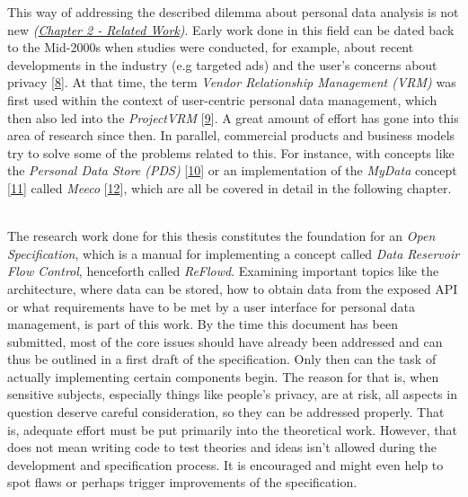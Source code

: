 \documentclass[12pt,english,a4paper,titlepage,cleardoublepage=empty,dottedtoc]{report}
\begin{document}
This way of addressing the described dilemma about personal data
analysis is not new \emph{(\protect\hyperlink{related-work}{Chapter 2 -
Related Work})}. Early work done in this field can be dated back to the
Mid-2000s when studies were conducted, for example, about recent
developments in the industry (e.g targeted ads) and the user's concerns
about privacy
{[}\protect\hyperlink{ref-study_2004_architecture-for-privacy-sensitive-ubiquitous-computing}{8}{]}.
At that time, the term \emph{Vendor Relationship Management (VRM)} was
first used within the context of user-centric personal data management,
which then also led into the \emph{ProjectVRM}
{[}\protect\hyperlink{ref-web_2010_projectvrm_about}{9}{]}. A great
amount of effort has gone into this area of research since then. In
parallel, commercial products and business models try to solve some of
the problems related to this. For instance, with concepts like the
\emph{Personal Data Store (PDS)}
{[}\protect\hyperlink{ref-paper_2013_the-personal-data-store-approach-to-personal-data-security_2013}{10}{]}
or an implementation of the \emph{MyData} concept
{[}\protect\hyperlink{ref-whitepaper_2014_mydata-a-nordic-model-for-human-centered-personal-data-management-and-processing}{11}{]}
called \emph{Meeco}
{[}\protect\hyperlink{ref-web_2016_meeco-how-it-works}{12}{]}, which are
all be covered in detail in the following chapter.

~\\
The research work done for this thesis constitutes the foundation for an
\emph{Open Specification}, which is a manual for implementing a concept
called \emph{Data Reservoir Flow Control}, henceforth called
\emph{ReFlowd}. Examining important topics like the architecture, where
data can be stored, how to obtain data from the exposed API or what
requirements have to be met by a user interface for personal data
management, is part of this work. By the time this document has been
submitted, most of the core issues should have already been addressed
and can thus be outlined in a first draft of the specification. Only
then can the task of actually implementing certain components begin. The
reason for that is, when sensitive subjects, especially things like
people's privacy, are at risk, all aspects in question deserve careful
consideration, so they can be addressed properly. That is, adequate
effort must be put primarily into the theoretical work. However, that
does not mean writing code to test theories and ideas isn't allowed
during the development and specification process. It is encouraged and
might even help to spot flaws or perhaps trigger improvements of the
specification.
\end{document}
